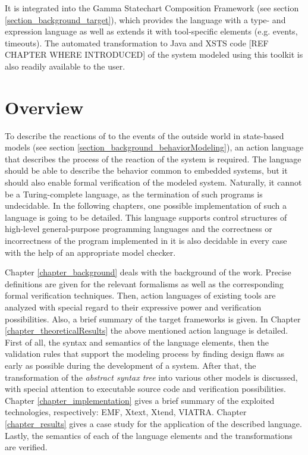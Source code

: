 It is integrated into the Gamma Statechart Composition Framework (see section \ref{section_background_target}), which provides the language with a type- and expression language as well as extends it with tool-specific elements (e.g. events, timeouts). The automated transformation to Java and XSTS code [REF CHAPTER WHERE INTRODUCED] of the system modeled using this toolkit is also readily available to the user. 


\section{Overview} \label{section_intro_overview}
To describe the reactions of to the events of the outside world in state-based models (see section \ref{section_background_behaviorModeling}), an action language that describes the process of the reaction of the system is required. The language should be able to describe the behavior common to embedded systems, but it should also enable formal verification of the modeled system. Naturally, it cannot be a Turing-complete language, as the termination of such programs is undecidable. In the following chapters, one possible implementation of such a language is going to be detailed. This language supports control structures of high-level general-purpose programming languages and the correctness or incorrectness of the program implemented in it is also decidable in every case with the help of an appropriate model checker.

Chapter \ref{chapter_background} deals with the background of the work. Precise definitions are given for the relevant formalisms as well as the corresponding formal verification techniques. Then, action languages of existing tools are analyzed with special regard to their expressive power and verification possibilities. Also, a brief summary of the target frameworks is given.
In Chapter \ref{chapter_theoreticalResults} the above mentioned action language is detailed. First of all, the syntax and semantics of the language elements, then the validation rules that support the modeling process by finding design flaws as early as possible during the development of a system. After that, the transformation of the \textit{abstract syntax tree} into various other models is discussed, with special attention to executable source code and verification possibilities.
Chapter \ref{chapter_implementation} gives a brief summary of the exploited technologies, respectively: EMF, Xtext, Xtend, VIATRA.
Chapter \ref{chapter_results} gives a case study for the application of the described language. Lastly, the semantics of each of the language elements and the transformations are verified.

